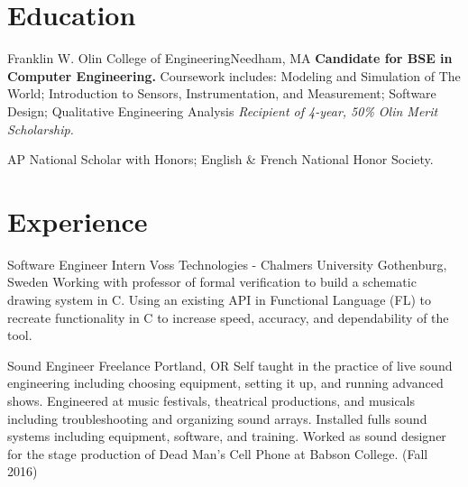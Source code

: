 \documentclass[11 pt]{moderncv}
\begin{document}
\maketitle

\vspace{-.6in}

\section{Education}

{Franklin W. Olin College of Engineering}{}{Needham, MA}{}
{
	\textbf{Candidate for BSE in Computer Engineering.}
	  Coursework includes:
    Modeling and Simulation of The World;
    Introduction to Sensors, Instrumentation, and Measurement;
    Software Design;
    Qualitative Engineering Analysis
	\newline
	\textit{Recipient of 4-year, 50\% Olin Merit Scholarship.}
}

{
	AP National Scholar with Honors; English \& French National Honor Society.
	\begin{flushright}
	\vspace {-0.3 in}
	\end{flushright}
	\vspace {-0.1 in}
}

\section{Experience}
\vspace{0.06 in}

{Software Engineer Intern}
{Voss Technologies - Chalmers University}
{Gothenburg, Sweden}
{}
{Working with professor of formal verification to build a schematic drawing system in C. Using an existing API in Functional Language (FL) to recreate functionality in C to increase speed, accuracy, and dependability of the tool.}

{Sound Engineer}
{Freelance}
{Portland, OR}
{}
{Self taught in the practice of live sound engineering including choosing equipment, setting it up, and running advanced shows. Engineered at music festivals, theatrical productions, and musicals including troubleshooting and organizing sound arrays. Installed fulls sound systems including equipment, software, and training. Worked as sound designer for the stage production of Dead Man's Cell Phone at Babson College. (Fall 2016)}
\end{document}
